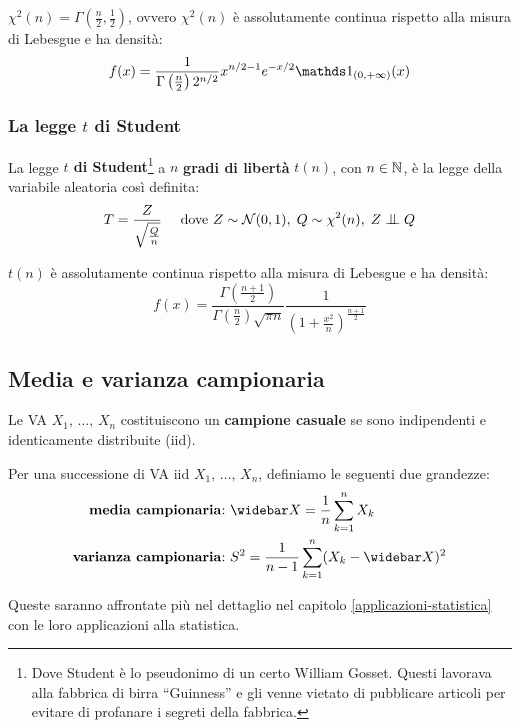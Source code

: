 \begin{prop}
  $\chi^2(n)=\Gamma( \frac{n}{2}, \frac{1}{2} )$, ovvero $\chi^2(n)$ è assolutamente continua rispetto alla misura di Lebesgue e ha densità:
  $$f(x)=\dfrac{1} { \Gamma \left( \frac{n}{2} \right) 2^{ n/2 } } x^{n/2-1} e^{-x/2} \Ind_{(0, +\infty)}(x)$$
\end{prop}

\subsubsection{La legge $t$ di Student}

\medskip
\begin{defn}
	La legge \textbf{$t$ di Student}\footnote{Dove Student è lo pseudonimo di un certo William Gosset. Questi lavorava alla fabbrica di birra ``Guinness'' e gli venne vietato di pubblicare articoli per evitare di profanare i segreti della fabbrica.} a $n$ \textbf{gradi di libertà} $t(n)$, con $n \in \mathbb N$, è la legge della variabile aleatoria così definita:
	$$T=\frac{Z}{\sqrt{\frac{Q}{n}}} \quad \text{ dove } Z \sim \Nc(0,1), \; Q \sim \chi^2(n), \; Z \indep Q$$
\end{defn}

\begin{prop}
  $t(n)$ è assolutamente continua rispetto alla misura di Lebesgue e ha densità:
  $$f(x)=\frac{\Gamma(\frac{n+1}{2})}{\Gamma(\frac{n}{2})\sqrt{\pi n}} \frac{1}{(1+\frac{x^2}{n})^{\frac{n+1}{2}}}$$
\end{prop}

\subsection{Media e varianza campionaria}
\begin{defn}
  Le VA $X_1, \, \dots, \,  X_n$ costituiscono un \textbf{campione casuale} se sono indipendenti e identicamente distribuite (iid).
\end{defn}

\begin{defn}
  Per una successione di VA iid $X_1, \, \dots, \,  X_n$, definiamo le seguenti due grandezze:
  \begin{align*}
    \text{\textbf{media campionaria}:}& \ \widebar X=\frac{1}{n} \sum_{k=1}^{n}X_k \\
    \text{\textbf{varianza campionaria}:}& \ S^2=\frac{1}{n-1} \sum_{k=1}^{n}(X_k-\widebar X)^2
  \end{align*}
\end{defn}
Queste saranno affrontate più nel dettaglio nel capitolo \ref{applicazioni-statistica} con le loro applicazioni alla statistica.


